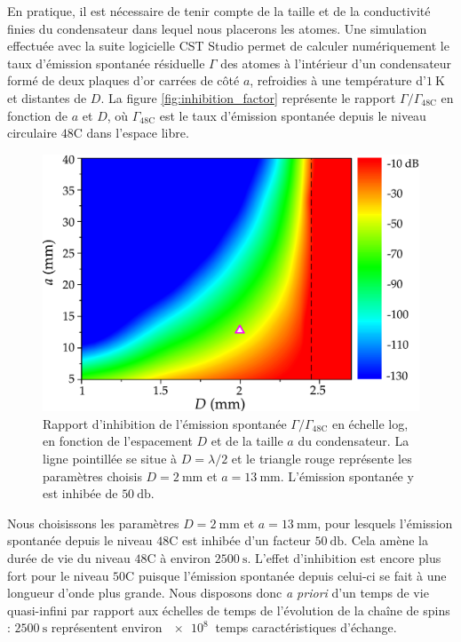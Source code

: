 En pratique, il est nécessaire de tenir compte de la taille et de la conductivité finies du condensateur dans lequel nous placerons les atomes.
Une simulation effectuée avec la suite logicielle CST Studio permet de calculer numériquement le taux d'émission spontanée résiduelle $\Gamma$ des atomes à l'intérieur d'un condensateur formé de deux plaques d'or carrées de côté $a$, refroidies à une température d'$\SI{1}{\K}$ et distantes de $D$.
La figure \eqref{fig:inhibition_factor} représente le rapport $\Gamma/\Gamma_{\mathrm{48C}}$ en fonction de $a$ et $D$, où $\Gamma_{\mathrm{48C}}$ est le taux d'émission spontanée depuis le niveau circulaire $\mathrm{48C}$ dans l'espace libre.
%
\begin{figure}[h]
\centering
\includegraphics[width=.7\linewidth]{figures/circsim/inhibition_factor}
\caption[Inhibition de l'émission spontanée en fonction des dimensions du condensateur]{
Rapport d'inhibition de l'émission spontanée $\Gamma/\Gamma_{\mathrm{48C}}$ en échelle log, en fonction de l'espacement $D$ et de la taille $a$ du condensateur.
La ligne pointillée se situe à $D=\lambda/2$ et le triangle rouge représente les paramètres choisis $D=\SI{2}{\mm}$ et $a=\SI{13}{\mm}$.
L'émission spontanée y est inhibée de $\SI{50}{\decibel}$.
}
\label{fig:inhibition_factor}
\end{figure}
%
Nous choisissons les paramètres $D=\SI{2}{\mm}$ et $a=\SI{13}{\mm}$, pour lesquels l'émission spontanée depuis le niveau $\mathrm{48C}$ est inhibée d'un facteur $\SI{50}{\decibel}$.
Cela amène la durée de vie du niveau $\mathrm{48C}$ à environ $\SI{2500}{\second}$.
L'effet d'inhibition est encore plus fort pour le niveau $\mathrm{50C}$ puisque l'émission spontanée depuis celui-ci se fait à une longueur d'onde plus grande.
Nous disposons donc \textit{a priori} d'un temps de vie quasi-infini par rapport aux échelles de temps de l'évolution de la chaîne de spins : $\SI{2500}{\s}$ représentent environ $\SI{e8}{}$ temps caractéristiques d'échange.


